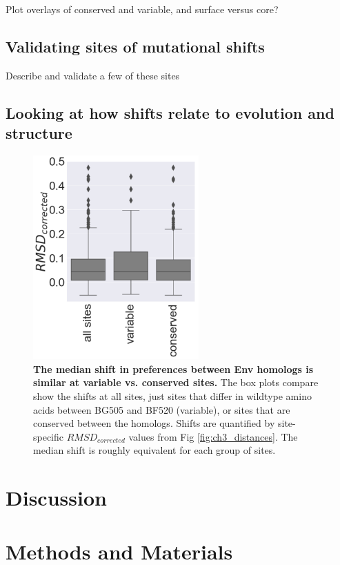 \documentclass[9pt,lineno]{elife}
\begin{document}
Plot overlays of conserved and variable, and surface versus core?

\subsection*{Validating sites of mutational shifts}
Describe and validate a few of these sites

\subsection*{Looking at how shifts relate to evolution and structure}

\begin{figure}
\centerline{\includegraphics[width=2.5in]{figures/distances_at_subsets_of_sites/distances_at_subsets_of_sites.png}}
\caption{\label{fig:shifts_at_variable_sites}
{\bf The median shift in preferences between Env homologs is similar at variable vs. conserved sites.}
The box plots compare show the shifts at all sites, just sites that differ in wildtype amino acids between BG505 and BF520 (variable), or sites that are conserved between the homologs.
Shifts are quantified by site-specific $RMSD_{corrected}$ values from Fig \ref{fig:ch3_distances}.
The median shift is roughly equivalent for each group of sites.
}
\end{figure}

\section{Discussion}


\section{Methods and Materials}
\end{document}
